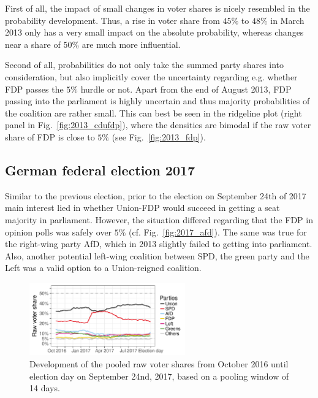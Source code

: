 \documentclass[smallcondensed]{svjour3}     %
\begin{document}
First of all, the impact of small changes in voter shares is nicely resembled
in the probability development. Thus, a rise in voter share from $45\%$ to 
$48\%$ in March 2013 only has a very small impact on the absolute
probability, whereas changes near a share of $50\%$ are much more influential.

Second of all, probabilities do not only take the summed party
shares into consideration, but also implicitly cover the 
uncertainty regarding e.g. whether FDP passes the $5\%$ hurdle
or not. Apart from the end of August 2013, FDP passing into the
parliament is highly uncertain and thus majority probabilities of
the coalition are rather small. This can best be seen in the
ridgeline plot (right panel in Fig.~\ref{fig:2013_cdufdp}), where
the densities are bimodal if the raw voter share of FDP is close
to $5\%$ (see Fig.~\ref{fig:2013_fdp}).



\subsection{German federal election 2017} \label{subsec:2017}
Similar to the previous election, prior to the election on
September 24th of 2017 main interest lied in whether Union-FDP
would succeed in getting a seat majority in parliament.
However, the situation differed regarding that the FDP in opinion
polls was safely over $5\%$ (cf. Fig.~\ref{fig:2017_afd}).
The same was true for the right-wing party AfD, which in 2013
slightly failed to getting into parliament. Also, another potential
left-wing coalition between SPD, the green party and the Left
was a valid option to a Union-reigned coalition.

\begin{figure}[H]\centering
\includegraphics[width=0.6\textwidth]{figures/2017_pooled_rawShares.pdf}
\caption{Development of the pooled raw voter shares from October 2016 until election day on September 24nd, 2017, based on a pooling window of 14 days.
\label{fig:2017}
}
\end{figure}
\end{document}
